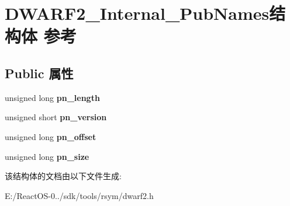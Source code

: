 \hypertarget{struct_d_w_a_r_f2___internal___pub_names}{}\section{D\+W\+A\+R\+F2\+\_\+\+Internal\+\_\+\+Pub\+Names结构体 参考}
\label{struct_d_w_a_r_f2___internal___pub_names}
\subsection*{Public 属性}
\begin{DoxyCompactItemize}
\item 
\mbox{\label{struct_d_w_a_r_f2___internal___pub_names_aeda250740d793f9d98d9caa6a6ac470a}} 
unsigned long {\bfseries pn\+\_\+length}
\item 
\mbox{\label{struct_d_w_a_r_f2___internal___pub_names_a9d8556da088ba3907a18f92a391a4b8d}} 
unsigned short {\bfseries pn\+\_\+version}
\item 
\mbox{\label{struct_d_w_a_r_f2___internal___pub_names_a2db8e9639f9c3eeb35ca05573f7d1d4a}} 
unsigned long {\bfseries pn\+\_\+offset}
\item 
\mbox{\label{struct_d_w_a_r_f2___internal___pub_names_a756d771babe8055fb325374171d6c3b3}} 
unsigned long {\bfseries pn\+\_\+size}
\end{DoxyCompactItemize}


该结构体的文档由以下文件生成\+:\begin{DoxyCompactItemize}
\item 
E\+:/\+React\+O\+S-\/0../sdk/tools/rsym/dwarf2.\+h\end{DoxyCompactItemize}
